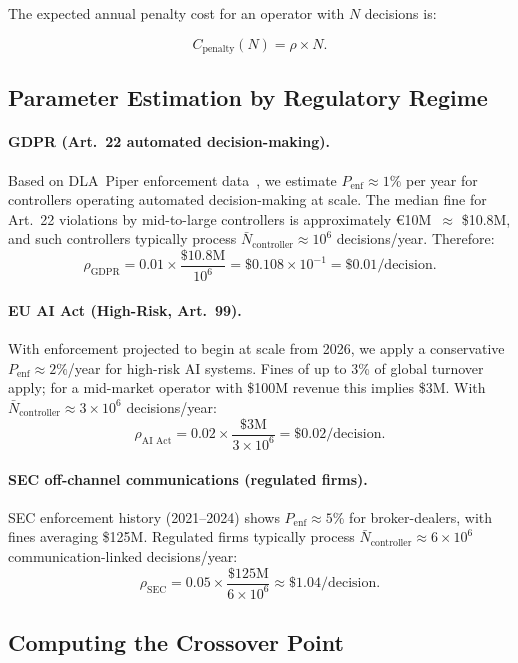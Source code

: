 The expected annual penalty cost for an operator with $N$ decisions is:

\[
  C_{\text{penalty}}(N) = \rho \times N.
\]

\subsection{Parameter Estimation by Regulatory Regime}
\label{subsec:params}

\paragraph{GDPR (Art.~22 automated decision-making).}
Based on DLA~Piper enforcement data~\cite{gdpr-fines-2025}, we estimate
$P_{\text{enf}} \approx 1\%$ per year for controllers operating
automated decision-making at scale. The median fine for Art.~22
violations by mid-to-large controllers is approximately
\euro{}10M~$\approx$ \$10.8M, and such controllers typically process
$\bar{N}_{\text{controller}} \approx 10^6$ decisions/year. Therefore:
\[
  \rho_{\text{GDPR}} = 0.01 \times \frac{\$10.8\text{M}}{10^6}
  = \$0.108 \times 10^{-1} = \$\mathbf{0.01}\text{/decision}.
\]

\paragraph{EU AI Act (High-Risk, Art.~99).}
With enforcement projected to begin at scale from 2026, we apply
a conservative $P_{\text{enf}} \approx 2\%$/year for high-risk AI
systems. Fines of up to 3\% of global turnover apply; for a
mid-market operator with \$100M revenue this implies \$3M. With
$\bar{N}_{\text{controller}} \approx 3 \times 10^6$ decisions/year:
\[
  \rho_{\text{AI Act}} = 0.02 \times \frac{\$3\text{M}}{3 \times 10^6}
  = \$\mathbf{0.02}\text{/decision}.
\]

\paragraph{SEC off-channel communications (regulated firms).}
SEC enforcement history (2021--2024) shows $P_{\text{enf}} \approx 5\%$
for broker-dealers, with fines averaging \$125M. Regulated firms
typically process $\bar{N}_{\text{controller}} \approx 6 \times 10^6$
communication-linked decisions/year:
\[
  \rho_{\text{SEC}} = 0.05 \times \frac{\$125\text{M}}{6 \times 10^6}
  \approx \$\mathbf{1.04}\text{/decision}.
\]

\subsection{Computing the Crossover Point}
\label{subsec:crossover-calc}


